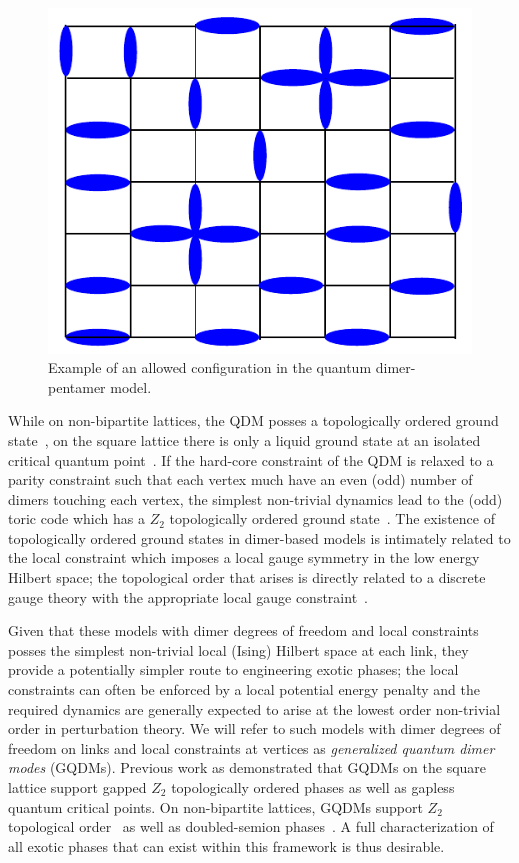 \documentclass[twocolumn,prb,aps,floatfix,superscriptaddress]{revtex4-1}
\begin{document}
\begin{figure}[t!]
    \centering
    \includegraphics[width=0.5\columnwidth]{QDPM_ex_config.pdf}
    \caption{Example of an allowed configuration in the quantum dimer-pentamer model.}
    \label{fig:QDPMex}
\end{figure}

While on non-bipartite lattices, the QDM posses a topologically ordered ground state~\cite{Moessner2001a,Fendley2002}, on the square lattice there is only a liquid ground state at an isolated critical quantum point~\cite{Leung1996,Syljuasen2006}. If the hard-core constraint of the QDM is relaxed to a parity constraint such that each vertex much have an even (odd) number of dimers touching each vertex, the simplest non-trivial dynamics lead to the (odd) toric code which has a $Z_2$ topologically ordered ground state~\cite{Kitaev2003,Wen2003}. The existence of topologically ordered ground states in dimer-based models is intimately related to the local constraint which imposes a local gauge symmetry in the low energy Hilbert space; the topological order that arises is directly related to a discrete gauge theory with the appropriate local gauge constraint~\cite{Moessner2001}.

Given that these models with dimer degrees of freedom and local constraints posses the simplest non-trivial local (Ising) Hilbert space at each link, they provide a potentially simpler route to engineering exotic phases; the local constraints can often be enforced by a local potential energy penalty and the required dynamics are generally expected to arise at the lowest order non-trivial order in perturbation theory. We will refer to such models with dimer degrees of freedom on links and local constraints at vertices as \emph{generalized quantum dimer modes} (GQDMs). Previous work as demonstrated that GQDMs on the square lattice support gapped $Z_2$ topologically ordered phases as well as gapless quantum critical points. On non-bipartite lattices, GQDMs support $Z_2$ topological order~\cite{Moessner2001a,Misguich2002} as well as doubled-semion phases~\cite{Qi2014,Buerschaper2014a}. A full characterization of all exotic phases that can exist within this framework is thus desirable.
\end{document}
